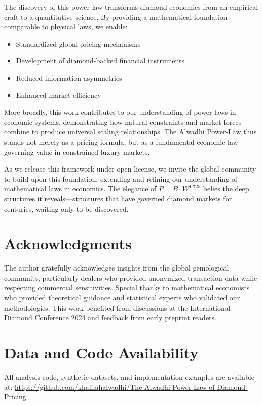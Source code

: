 \documentclass[12pt,a4paper]{article}
\theoremstyle{definition}
\theoremstyle{remark}
\begin{document}
The discovery of this power law transforms diamond economics from an empirical craft to a quantitative science. By providing a mathematical foundation comparable to physical laws, we enable:

\begin{itemize}
\item Standardized global pricing mechanisms
\item Development of diamond-backed financial instruments
\item Reduced information asymmetries
\item Enhanced market efficiency
\end{itemize}

More broadly, this work contributes to our understanding of power laws in economic systems, demonstrating how natural constraints and market forces combine to produce universal scaling relationships. The Alwadhi Power-Law thus stands not merely as a pricing formula, but as a fundamental economic law governing value in constrained luxury markets.

As we release this framework under open license, we invite the global community to build upon this foundation, extending and refining our understanding of mathematical laws in economics. The elegance of $P = B \cdot W^{1.725}$ belies the deep structures it reveals—structures that have governed diamond markets for centuries, waiting only to be discovered.

\section*{Acknowledgments}

The author gratefully acknowledges insights from the global gemological community, particularly dealers who provided anonymized transaction data while respecting commercial sensitivities. Special thanks to mathematical economists who provided theoretical guidance and statistical experts who validated our methodologies. This work benefited from discussions at the International Diamond Conference 2024 and feedback from early preprint readers.

\section*{Data and Code Availability}

All analysis code, synthetic datasets, and implementation examples are available at: \url{https://github.com/khalilahalwadhi/The-Alwadhi-Power-Law-of-Diamond-Pricing}
\end{document}
